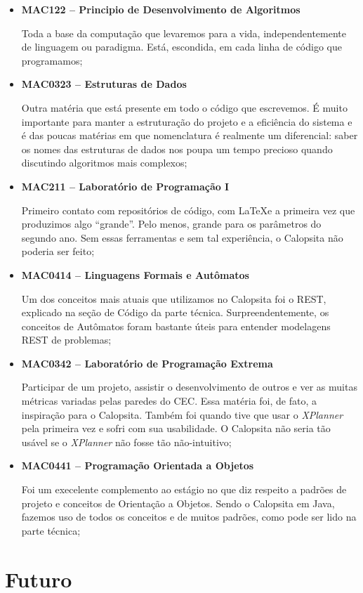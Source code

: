 \documentclass[titlepage,a4paper]{article}
\newcommand{\calopsita}{Calopsita}
\begin{document}
\begin{itemize}
	\item{\textbf{MAC122 -- Principio de Desenvolvimento de Algoritmos}

		Toda a base da computação que levaremos para a vida, independentemente de linguagem ou paradigma. Está, escondida, em cada linha de código que programamos;}
	\item{\textbf{MAC0323 -- Estruturas de Dados} 

		Outra matéria que está presente em todo o código que escrevemos. É muito importante para manter a estruturação do projeto e a eficiência do sistema e é das poucas matérias em que nomenclatura é realmente um diferencial: saber os nomes das estruturas de dados nos poupa um tempo precioso quando discutindo algoritmos mais complexos;}
	\item{\textbf{MAC211 -- Laboratório de Programação I} 

		Primeiro contato com repositórios de código, com \LaTeX e a primeira vez que produzimos algo ``grande''. Pelo menos, grande para os parâmetros do segundo ano. Sem essas ferramentas e sem tal experiência, o \calopsita{} não poderia ser feito;}
	\item{\textbf{MAC0414 -- Linguagens Formais e Autômatos} 

		Um dos conceitos mais atuais que utilizamos no \calopsita{} foi o REST, explicado na seção de Código da parte técnica. Surpreendentemente, os conceitos de Autômatos foram bastante úteis para entender modelagens REST de problemas;}
	\item{\textbf{MAC0342 -- Laboratório de Programação Extrema}

		Participar de um projeto, assistir o desenvolvimento de outros e ver as muitas métricas variadas pelas paredes do CEC. Essa matéria foi, de fato, a inspiração para o \calopsita{}. Também foi quando tive que usar o \textit{XPlanner} pela primeira vez e sofri com sua usabilidade. O \calopsita{} não seria tão usável se o \textit{XPlanner} não fosse tão não-intuitivo;}
	\item{\textbf{MAC0441 -- Programação Orientada a Objetos}

		Foi um execelente complemento ao estágio no que diz respeito a padrões de projeto e conceitos de Orientação a Objetos. Sendo o \calopsita{} em Java, fazemos uso de todos os conceitos e de muitos padrões, como pode ser lido na parte técnica;}
\end{itemize}

\section{Futuro}
\end{document}
